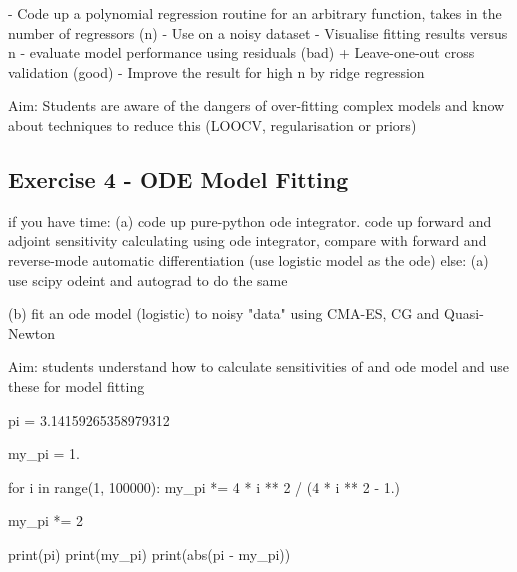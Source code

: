 \documentclass[a4paper]{article}
\begin{document}
- Code up a polynomial regression routine for an arbitrary function, takes in the number
of regressors (n)
- Use on a noisy dataset
  - Visualise fitting results versus n
  - evaluate model performance using residuals (bad) + Leave-one-out cross validation
  (good)
- Improve the result for high n by ridge regression

Aim: Students are aware of the dangers of over-fitting complex models and know about
techniques to reduce this (LOOCV, regularisation or priors)


\subsection*{Exercise 4 - ODE Model Fitting}

if you have time:
  (a) code up pure-python ode integrator. code up forward and adjoint sensitivity calculating using ode integrator, compare
      with forward and reverse-mode automatic differentiation (use logistic model as the ode)
else:
  (a) use scipy odeint and autograd to do the same

(b) fit an ode model (logistic) to noisy "data" using CMA-ES, CG and Quasi-Newton

Aim: students understand how to calculate sensitivities of and ode model and use these
for model fitting

\begin{solution}
\begin{python}
pi = 3.14159265358979312

my_pi = 1.

for i in range(1, 100000):
    my_pi *= 4 * i ** 2 / (4 * i ** 2 - 1.)

my_pi *= 2

print(pi)
print(my_pi)
print(abs(pi - my_pi))
\end{python}
\end{solution}
\end{document}
